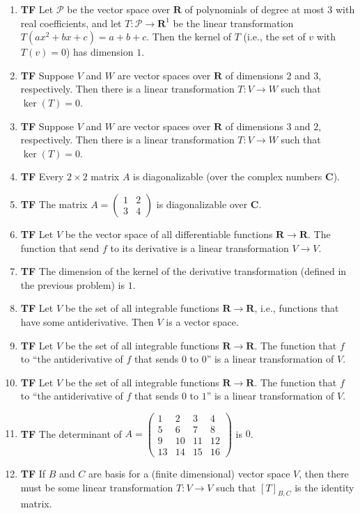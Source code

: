 \documentclass[10pt]{article}
\newcommand{\tf}[1]{\item {\bf {\color{blue}\hspace{1em}T\hspace{1em}F}}\hspace{1em} #1}
\newcommand{\R}{\mathbf{R}}
\newcommand{\C}{\mathbf{C}}
\renewcommand{\P}{\mathcal{P}}
\begin{document}
\begin{enumerate}
\tf{Let $\P$ be the vector space over $\R$ of polynomials of degree at most $3$ with real coefficients,
and let $T:\P\to\R^1$ be the linear transformation $T(ax^2+bx+c)=a+b+c$.
Then the kernel of $T$ (i.e., the set of $v$ with $T(v)=0$) has dimension $1$.}

\tf{Suppose $V$ and $W$ are vector spaces over $\R$ of dimensions $2$ and $3$, respectively.
Then there is a linear transformation $T:V\to W$ such that $\ker(T)=0$.}

\tf{Suppose $V$ and $W$ are vector spaces over $\R$ of dimensions $3$ and $2$, respectively.
Then there is a linear transformation $T:V\to W$ such that $\ker(T)=0$.}

\tf{Every $2\times 2$ matrix $A$ is diagonalizable (over the complex numbers $\C$).}

\tf{The matrix $A=\left(\begin{array}{rr}
1 & 2 \\
3 & 4
\end{array}\right)$ is diagonalizable over $\C$.}

\tf{Let $V$ be the vector space of all differentiable functions $\R\to \R$.
The function that send $f$ to its derivative is a linear transformation $V\to V$.}

\tf{The dimension of the kernel of the derivative transformation (defined in the previous problem) is $1$.}

\tf{Let $V$ be the set of all integrable functions $\R\to \R$, i.e., functions that
have some antiderivative.  Then $V$ is a vector space.}

\tf{Let $V$ be the set of all integrable functions $\R\to \R$.
The function that $f$ to ``the antiderivative of $f$ that sends
$0$ to $0$'' is a linear transformation of $V$.}

\tf{Let $V$ be the set of all integrable functions $\R\to \R$.
The function that $f$ to ``the antiderivative of $f$ that sends
$0$ to $1$'' is a linear transformation of $V$.}

\tf{The determinant of $A=\left(\begin{array}{rrrr}
1 & 2 & 3 & 4 \\
5 & 6 & 7 & 8 \\
9 & 10 & 11 & 12 \\
13 & 14 & 15 & 16
\end{array}\right)$ is $0$.}

\tf{If $B$ and $C$ are basis for a (finite dimensional) vector space $V$, then there must be some linear transformation
$T:V\to V$ such that $[T]_{B,C}$ is the identity matrix.}


\end{enumerate}
\end{document}
